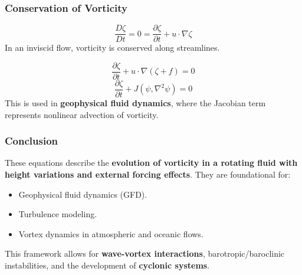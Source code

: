     \subsubsection*{Conservation of Vorticity}
    \begin{equation*}
        \frac{D \zeta}{D t}=0=\frac{\partial \zeta}{\partial t}+u \cdot \nabla \zeta
    \end{equation*}
    In an inviscid flow, vorticity is conserved along streamlines.

    \begin{equation*}
        \frac{\partial \zeta}{\partial t} + u \cdot \nabla(\zeta + f)=0
    \end{equation*}
    \begin{equation*}
        \frac{\partial \zeta}{\partial t}+J(\psi, \nabla^2 \psi)=0
    \end{equation*}
    This is used in \textbf{geophysical fluid dynamics}, where the Jacobian term represents nonlinear advection of vorticity.

    \subsubsection*{Conclusion}
    These equations describe the \textbf{evolution of vorticity in a rotating fluid with height variations and external forcing effects}. They are foundational for:
    \begin{itemize}
        \item Geophysical fluid dynamics (GFD).
        \item Turbulence modeling.
        \item Vortex dynamics in atmospheric and oceanic flows.
    \end{itemize}
    This framework allows for \textbf{wave-vortex interactions}, barotropic/baroclinic instabilities, and the development of \textbf{cyclonic systems}.

